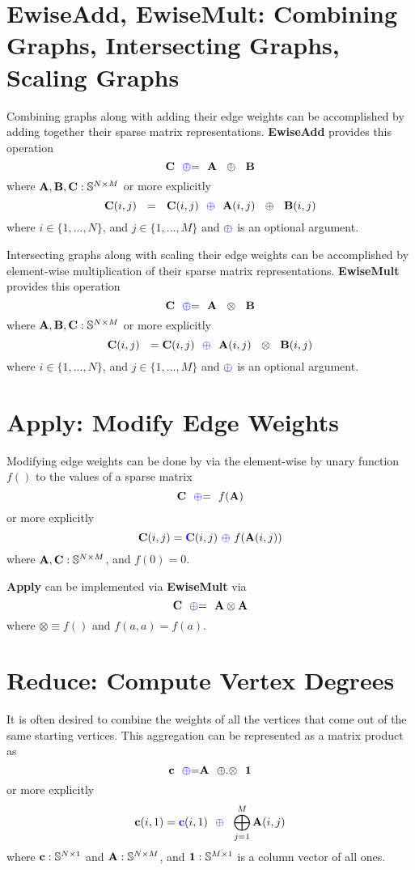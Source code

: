 \section{EwiseAdd, EwiseMult: Combining Graphs, Intersecting Graphs, Scaling Graphs}
  Combining graphs along with adding their edge weights can be accomplished by adding together their sparse matrix representations. {\bf EwiseAdd} provides this operation
$$
   {\bf C} ~~ {\textcolor{blue}{\oplus}}{=} ~~ {\bf A} ~~ \oplus ~~ {\bf B}
$$
where ${\bf A},{\bf B},{\bf C}: \mathbb{S}^{N \times M}$ or more explicitly 
$$
   {\bf C}(i,j) ~~ = ~~ {\bf C}(i,j) ~~ {\textcolor{blue}{\oplus}} ~~ {\bf A}(i,j) ~~ \oplus ~~{\bf B}(i,j)
$$
where $i \in \{1,...,N\}$, and $j \in \{1,...,M\}$ and ${\textcolor{blue}{\oplus}}$ is an optional argument. 

  Intersecting graphs along with scaling their edge weights can be accomplished by element-wise multiplication of their sparse matrix representations. {\bf EwiseMult} provides this operation
$$
   {\bf C} ~~ {\textcolor{blue}{\oplus}}{=} ~~ {\bf A} ~~ \otimes ~~ {\bf B}
$$
where ${\bf A},{\bf B},{\bf C}: \mathbb{S}^{N \times M}$ or more explicitly 
$$
   {\bf C}(i,j) ~~ = {\bf C}(i,j) ~~ {\textcolor{blue}{\oplus}} ~~ {\bf A}(i,j) ~~ \otimes ~~{\bf B}(i,j)
$$
where $i \in \{1,...,N\}$, and $j \in \{1,...,M\}$ and ${\textcolor{blue}{\oplus}}$ is an optional argument. 

\section{Apply: Modify Edge Weights}
  Modifying edge weights can be done by via the element-wise by unary function $f()$ to the values of a sparse matrix
$$
   {\bf C} ~~ {\textcolor{blue}{\oplus}}{=} ~~ f({\bf A})
$$
or more explicitly
$$
   {\bf C}(i,j) = {\textcolor{blue}{\bf C}}(i,j) ~ {\textcolor{blue}{\oplus}} ~f({\bf A}(i,j))
$$
where ${\bf A},{\bf C}: \mathbb{S}^{N \times M}$, and $f(0) = 0$.

  {\bf Apply} can be implemented via {\bf EwiseMult} via
$$
   {\bf C} ~~ {\textcolor{blue}{\oplus}}{=} ~~ {\bf A} \otimes {\bf A}
$$
where $\otimes \equiv f()$ and $f(a,a) = f(a)$.

\section{Reduce: Compute Vertex Degrees}
  It is often desired to combine the weights of all the vertices that come out of the same starting vertices.  This aggregation can be represented as a matrix product as
$$
   {\bf c} ~~ {\textcolor{blue}{\oplus}}{=} {\bf A} ~~ {\oplus}.{\otimes} ~~{\bf 1}
$$
or more explicitly
$$
   {\bf c}(i,1) = {\textcolor{blue}{\bf c}}(i,1) ~~ {\textcolor{blue}{\oplus}} ~~ \bigoplus_{j=1}^M {\bf A}(i,j)
$$
where ${\bf c}: \mathbb{S}^{N \times 1}$ and ${\bf A}: \mathbb{S}^{N \times M}$, and ${\bf 1}: \mathbb{S}^{M \times 1}$ is a column vector of all ones.

